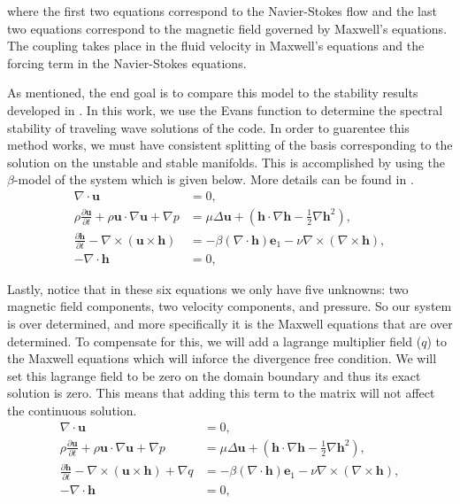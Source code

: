\documentclass{article}
\begin{document}
where the first two equations correspond to the Navier-Stokes flow and the last two equations correspond to the magnetic field governed by Maxwell's equations. The coupling takes place in the fluid velocity in Maxwell's equations and the forcing term in the Navier-Stokes equations. 

As mentioned, the end goal is to compare this model to the stability results developed in \cite{bryn}. In this work, we use the Evans function to determine the spectral stability of traveling wave solutions of the code. In order to guarentee this method works, we must have consistent splitting of the basis corresponding to the solution on the unstable and stable manifolds. This is accomplished by using the $\beta$-model of the system which is given below. More details can be found in \cite{BMZ}.
\begin{align*}
    \nabla \cdot \boldsymbol{u} &= 0,\\
    \rho \frac{\partial  \boldsymbol{u}}{\partial t} + \rho \boldsymbol{u} \cdot \nabla \boldsymbol{u} + \nabla p &= \mu \Delta \boldsymbol{u}+ \left(\boldsymbol{h}\cdot \nabla \boldsymbol{h} - \frac{1}{2}\nabla \boldsymbol{h}^2\right),\\
    \frac{\partial \boldsymbol{h} }{\partial t} - \nabla \times (\boldsymbol{u}\times \boldsymbol{h}) &=- \beta (\nabla \cdot \boldsymbol{h})\boldsymbol{e}_1 -\nu \nabla \times (\nabla \times \boldsymbol{h}), \\
    -\nabla \cdot \boldsymbol{h} &= 0,
\end{align*}

Lastly, notice that in these six equations we only have five unknowns: two magnetic field components, two velocity components, and pressure. So our system is over determined, and more specifically it is the Maxwell equations that are over determined. To compensate for this, we will add a lagrange multiplier field ($q$) to the Maxwell equations which will inforce the divergence free condition. We will set this lagrange field to be zero on the domain boundary and thus its exact solution is zero. This means that adding this term to the matrix will not affect the continuous solution. 
\begin{align*}
    \nabla \cdot \boldsymbol{u} &= 0,\\
    \rho \frac{\partial  \boldsymbol{u}}{\partial t} + \rho \boldsymbol{u} \cdot \nabla \boldsymbol{u} + \nabla p &= \mu \Delta \boldsymbol{u}+ \left(\boldsymbol{h}\cdot \nabla \boldsymbol{h} - \frac{1}{2}\nabla \boldsymbol{h}^2\right),\\
    \frac{\partial \boldsymbol{h} }{\partial t} - \nabla \times (\boldsymbol{u}\times \boldsymbol{h}) +\nabla q &=- \beta (\nabla \cdot \boldsymbol{h})\boldsymbol{e}_1 -\nu \nabla \times (\nabla \times \boldsymbol{h}), \\
    -\nabla \cdot \boldsymbol{h} &= 0,
\end{align*}
\end{document}
